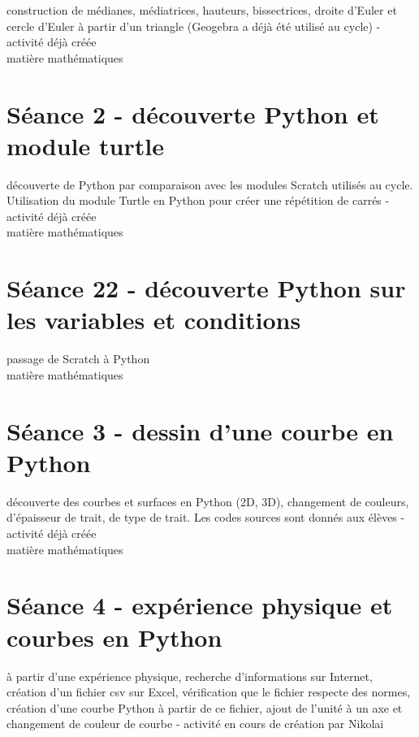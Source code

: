 \documentclass{moncours}
\begin{document}
construction de médianes, médiatrices, hauteurs, bissectrices, droite d'Euler et cercle d'Euler à partir d'un triangle (Geogebra a déjà été utilisé au cycle) - activité déjà créée\\

matière mathématiques

\section{Séance 2 - découverte Python et module turtle}

découverte de Python par comparaison avec les modules Scratch utilisés au cycle. Utilisation du module Turtle en Python pour créer une répétition de carrés - activité déjà créée\\

matière mathématiques

\section{Séance 22 - découverte Python sur les variables et conditions}

passage de Scratch à Python\\

matière mathématiques

\section{Séance 3  - dessin d'une courbe en Python}

découverte des courbes et surfaces en Python (2D, 3D), changement de couleurs, d'épaisseur de trait, de type de trait. Les codes sources sont donnés aux élèves - activité déjà créée\\

matière mathématiques

\section{Séance 4 - expérience physique et courbes en Python}

 à partir d'une expérience physique, recherche d'informations sur Internet, création d'un fichier csv sur Excel, vérification que le fichier respecte des normes, création d'une courbe Python à partir de ce fichier, ajout de l'unité à un axe et changement de couleur de courbe - activité en cours de création par Nikolai\\
\end{document}
